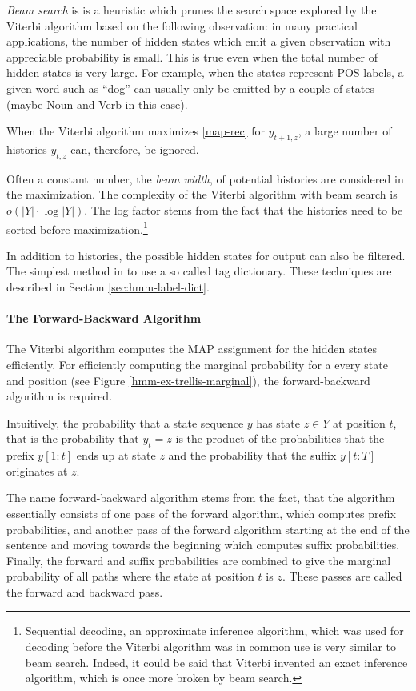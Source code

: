 {\it Beam search} is is a heuristic which prunes the search space
explored by the Viterbi algorithm based on the following observation:
in many practical applications, the number of hidden states which emit
a given observation with appreciable probability is small. This is
true even when the total number of hidden states is very large. For
example, when the states represent POS labels, a given word such as
``dog'' can usually only be emitted by a couple of states (maybe Noun
and Verb in this case).

When the Viterbi algorithm maximizes \eqref{map-rec} for $y_{t+1,z}$,
a large number of histories $y_{t,z}$ can, therefore, be ignored.

Often a constant number, the {\it beam width}, of potential histories
are considered in the maximization. The complexity of the Viterbi
algorithm with beam search is $o(|Y|\cdot \log|Y|)$. The log factor
stems from the fact that the histories need to be sorted before
maximization.\footnote{Sequential decoding, an approximate inference
  algorithm, which was used for decoding before the Viterbi algorithm
  was in common use \citep{Forney2005} is very similar to beam
  search. Indeed, it could be said that Viterbi invented an exact
  inference algorithm, which is once more broken by beam search.}

In addition to histories, the possible hidden states for output can
also be filtered. The simplest method in to use a so called tag
dictionary. These techniques are described in Section
\ref{sec:hmm-label-dict}.

\paragraph{The Forward-Backward Algorithm}
\label{hmm-fw-bw}
The Viterbi algorithm computes the MAP assignment for the hidden
states efficiently. For efficiently computing the marginal probability
for a every state and position (see Figure
\ref{hmm-ex-trellis-marginal}), the forward-backward algorithm is
required.

Intuitively, the probability that a state sequence $y$ has state $z \in Y$
at position $t$, that is the probability that $y_t = z$ is the product
of the probabilities that the prefix $y[1:t]$ ends up at state $z$ and
the probability that the suffix $y[t:T]$ originates at $z$. 

The name forward-backward algorithm stems from the fact, that the
algorithm essentially consists of one pass of the forward algorithm,
which computes prefix probabilities, and another pass of the forward
algorithm starting at the end of the sentence and moving towards the
beginning which computes suffix probabilities. Finally, the forward
and suffix probabilities are combined to give the marginal probability
of all paths where the state at position $t$ is $z$. These passes are
called the forward and backward pass.

